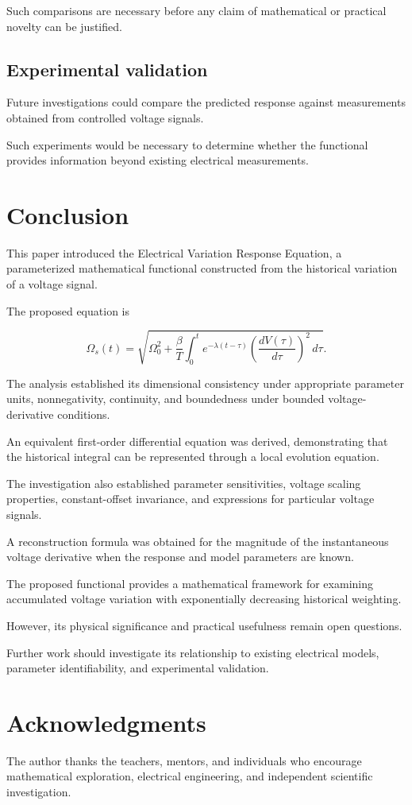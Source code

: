 \documentclass[12pt]{article}
\theoremstyle{definition}
\theoremstyle{remark}
\begin{document}
Such comparisons are necessary before
any claim of mathematical or practical novelty
can be justified.

\subsection{Experimental validation}

Future investigations could compare the
predicted response against measurements
obtained from controlled voltage signals.

Such experiments would be necessary to
determine whether the functional provides
information beyond existing electrical
measurements.

\section{Conclusion}

This paper introduced the Electrical Variation
Response Equation, a parameterized mathematical
functional constructed from the historical
variation of a voltage signal.

The proposed equation is

\[
\Omega_s(t)=
\sqrt{
\Omega_0^2+
\frac{\beta}{T}
\int_0^t
e^{-\lambda(t-\tau)}
\left(\frac{dV(\tau)}{d\tau}\right)^2
\,d\tau
}.
\]

The analysis established its dimensional
consistency under appropriate parameter units,
nonnegativity, continuity, and boundedness
under bounded voltage-derivative conditions.

An equivalent first-order differential equation
was derived, demonstrating that the historical
integral can be represented through a local
evolution equation.

The investigation also established parameter
sensitivities, voltage scaling properties,
constant-offset invariance, and expressions
for particular voltage signals.

A reconstruction formula was obtained for
the magnitude of the instantaneous voltage
derivative when the response and model
parameters are known.

The proposed functional provides a mathematical
framework for examining accumulated voltage
variation with exponentially decreasing
historical weighting.

However, its physical significance and
practical usefulness remain open questions.

Further work should investigate its relationship
to existing electrical models, parameter
identifiability, and experimental validation.

\section{Acknowledgments}

The author thanks the teachers, mentors,
and individuals who encourage mathematical
exploration, electrical engineering, and
independent scientific investigation.
\end{document}
